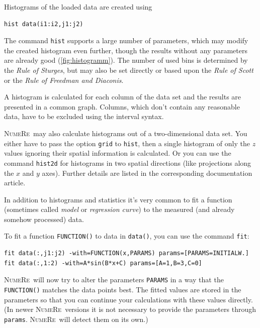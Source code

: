 \documentclass[DIV=14,headsepline,footsepline]{scrbook}
\newcommand{\NR}{\textsc{Nu\-me\-Re}}
\begin{document}
				Histograms of the loaded data are created using 
				\begin{lstlisting}
hist data(i1:i2,j1:j2)
				\end{lstlisting}
				The command \lstinline+hist+ supports a large number of parameters, which may modify the created histogram even further, though the results without any parameters are already good (\autoref{fig:histogramm}). The number of used bins is determined by the \emph{Rule of Sturges}, but may also be set directly or based upon the \emph{Rule of Scott} or the \emph{Rule of Freedman and Diaconis}.
				
				A histogram is calculated for each column of the data set and the results are presented in a common graph. Columns, which don't contain any reasonable data, have to be excluded using the interval syntax.
				
				\NR\ may also calculate histograms out of a two-dimensional data set. You either have to pass the option \lstinline+grid+ to \lstinline+hist+, then a single histogram of only the $z$ values ignoring their spatial information is calculated. Or you can use the command \lstinline+hist2d+ for histograms in two spatial directions (like projections along the $x$ and $y$ axes). Further details are listed in the corresponding documentation article.
				
				In addition to histograms and statistics it's very common to fit a function (sometimes called \emph{model} or \emph{regression curve}) to the measured (and already somehow processed) data.
				
				To fit a function \lstinline+FUNCTION()+ to data in \lstinline+data()+, you can use the command \lstinline+fit+:
				\begin{lstlisting}
fit data(:,j1:j2) -with=FUNCTION(x,PARAMS) params=[PARAMS=INITIALW.]
fit data(:,1:2) -with=A*sin(B*x+C) params=[A=1,B=3,C=0]
				\end{lstlisting}
				\NR\ will now try to alter the parameters \lstinline+PARAMS+ in a way that the \lstinline+FUNCTION()+ matches the data points best. The fitted values are stored in the parameters so that you can continue your calculations with these values directly. (In newer \NR\ versions it is not necessary to provide the parameters through \lstinline+params+. \NR\ will detect them on its own.)
				
\end{document}
